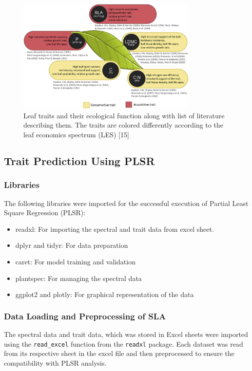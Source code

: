 \documentclass[12pt,a4paper]{report}
\begin{document}
\begin{figure}[h]
    \centering
    \includegraphics[width=0.8\textwidth]{Figures/traits.jpg}
    \caption{Leaf traits and their ecological function along with list of literature describing them. The traits are colored differently according to the leaf economics spectrum (LES) [15]}
    \label{fig:traits}
\end{figure}

\subsection{Trait Prediction Using PLSR}
\subsubsection*{Libraries}
The following libraries were imported for the successful execution of Partial Least Square Regression (PLSR): \\
\begin{itemize}
    \item readxl: For importing the spectral and trait data from excel sheet.
    \item dplyr and tidyr: For data preparation
    \item caret: For model training and validation
    \item plantspec: For managing the spectral data
    \item ggplot2 and plotly: For graphical representation of the data
\end{itemize}

\subsubsection*{Data Loading and Preprocessing of SLA}
The spectral data and trait data, which was stored in Excel sheets were imported using the \texttt{read\_excel} function from the \texttt{readxl} package. Each dataset was read from its respective sheet in the excel file and then preprocessed to ensure the compatibility with PLSR analysis. \\
\end{document}
